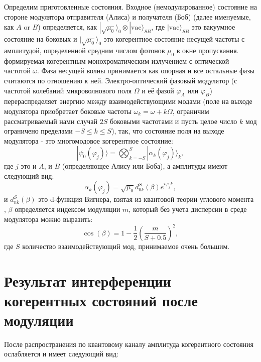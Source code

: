 Определим приготовленные состояния. Входное (немодулированное) состояние на стороне модулятора отправителя (Алиса) и получателя (Боб) (далее именуемые, как $A$ or $B$) определяется, как $|\sqrt{\mu_0}\rangle_0\otimes|\mathrm{vac}\rangle_{SB}$, где $|\mathrm{vac}\rangle_{SB}$ это вакуумное состояние на боковых и $|\sqrt{\mu_0}\rangle_0$ это когерентное состояние несущей частоты с амплитудой, определенной средним числом фотонов $\mu_0$ в окне пропускания. формируемая когерентным монохроматическим излучением с оптической частотой $\omega$. Фаза несущей волны принимается как опорная и все остальные фазы считаются по отношению к ней. Электро-оптический фазовый модулятор (с частотой колебаний микроволнового поля $\Omega$ и её фазой $\varphi_A$ или $\varphi_B$) перераспределяет энергию между взаимодействующими модами (поле на выходе модулятора приобретает боковые частоты $\omega_k=\omega+k\Omega$, ограничим рассматриваемый нами случай $2S$ боковыми частотами и пусть целое число $k$ мод ограничено пределами $-S\le k\le S$), так, что состояние поля на выходе модулятора - это многомодовое когерентное состояние: 
%
\begin{equation}\label{phi}
|\psi_0(\varphi_j)\rangle = \bigotimes_{k=-S}^S|{\alpha_k(\varphi_j)}\rangle_k,
\end{equation}
%
где $j$ это и $A$, и $B$ (определяющее Алису или Боба), а амплитуды имеют следующий вид: 
%
\begin{equation}\label{alpha}
\alpha_k(\varphi_j)=\sqrt{\mu_0}d^S_{0k}(\beta)e^{i\varphi_jk},
\end{equation}
%
и $d^S_{nk}(\beta)$ это d-функция Вигнера, взятая из квантовой теории углового момента \cite{varshalovich1988quantum}, $\beta$ определяется индексом модуляции $m$, который без учета дисперсии в среде модулятора можно выразить: 
%
\begin{equation}\label{betam}
\cos{({\beta})}=1-\frac{1}{2}{\left(\frac{m}{S+0.5}\right)^2},
\end{equation}
где $S$ количество взаимодействующий мод, принимаемое очень большим. 

\pagebreak

\section{Результат интерференции когерентных состояний после модуляции} \label{ch:ch4/sec4}

После распространения по квантовому каналу амплитуда когерентного состояния ослабляется и имеет следующий вид:

